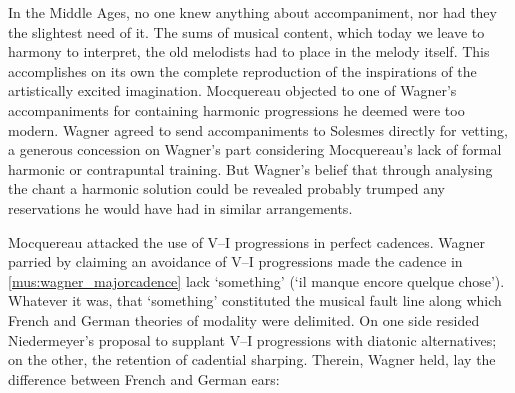   {\cite[26, 252 n.~1]{WagnerEinfuehrunggregorianischenMelodien1895}}
{In the Middle Ages, no one knew anything about accompaniment, nor had they the slightest need of it. The sums of musical content, which today we leave to harmony to interpret, the old melodists had to place in the melody itself. This accomplishes on its own the complete reproduction of the inspirations of the artistically excited imagination.}
%
\noindent
Mocquereau objected to one of Wagner's accompaniments for containing harmonic progressions he deemed were too modern.
Wagner agreed to send accompaniments to Solesmes directly for vetting, a generous concession on Wagner's part considering Mocquereau's lack of formal harmonic or contrapuntal training.
But Wagner's belief that through analysing the chant a harmonic solution could be revealed probably trumped any reservations he would have had in similar arrangements.

Mocquereau attacked the use of V--I progressions in perfect cadences.
Wagner parried by claiming an avoidance of V--I progressions made the cadence in \cref{mus:wagner_majorcadence} lack `something' (`il manque encore quelque chose').
Whatever it was, that `something' constituted the musical fault line along which French and German theories of modality were delimited.
On one side resided Niedermeyer's proposal to supplant V--I progressions with diatonic alternatives; on the other, the retention of cadential sharping.
Therein, Wagner held, lay the difference between French and German ears:
\pagebreak{}

